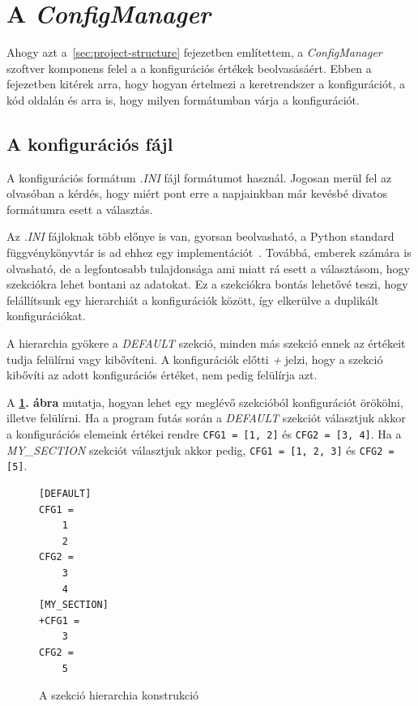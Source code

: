 \section{A \textit{ConfigManager}}\label{chp:config-manager}

    Ahogy azt a~\ref{sec:project-structure} fejezetben említettem, a \textit{ConfigManager} szoftver komponens felel a
    a konfigurációs értékek beolvasásáért. Ebben a fejezetben kitérek arra, hogy hogyan értelmezi a keretrendszer a
    konfigurációt, a kód oldalán és arra is, hogy milyen formátumban várja a konfigurációt.

    \subsection{A konfigurációs fájl}

        A konfigurációs formátum \textit{.INI} fájl formátumot használ. Jogosan merül fel az olvasóban a kérdés, hogy
        miért pont erre a napjainkban már kevésbé divatos formátumra esett a választás.

        Az \textit{.INI} fájloknak több előnye is van, gyorsan beolvasható, a Python standard függvénykönyvtár is ad
        ehhez egy implementációt~\cite{pythonconfigparser}. Továbbá, emberek számára is olvasható, de a legfontosabb
        tulajdonsága ami miatt rá esett a választásom, hogy szekciókra lehet bontani az adatokat. Ez a szekciókra
        bontás lehetővé teszi, hogy felállítsunk egy hierarchiát a konfigurációk között, így elkerülve a duplikált
        konfigurációkat.

        A hierarchia gyökere a \textit{DEFAULT} szekció, minden más szekció ennek az értékeit tudja felülírni vagy
        kibővíteni. A konfigurációk előtti \textit{+} jelzi, hogy a szekció kibővíti az adott konfigurációs értéket,
        nem pedig felülírja azt.

        A \textbf{\ref{fig:section-hierarchy}. ábra} mutatja, hogyan lehet egy meglévő szekcióból konfigurációt
        örökölni, illetve felülírni. Ha a program futás során a \textit{DEFAULT} szekciót választjuk akkor a
        konfigurációs elemeink értékei rendre \verb|CFG1 = [1, 2]| és \verb|CFG2 = [3, 4]|. Ha a \textit{MY\_SECTION}
        szekciót választjuk akkor pedig, \verb|CFG1 = [1, 2, 3]| és \verb|CFG2 = [5]|.

        \begin{figure}[ht]
            \centering
            \begin{verbatim}
[DEFAULT]
CFG1 =
    1
    2
CFG2 =
    3
    4
[MY_SECTION]
+CFG1 =
    3
CFG2 =
    5
        \end{verbatim}
            \caption{\label{fig:section-hierarchy} A szekció hierarchia konstrukció}
        \end{figure}

